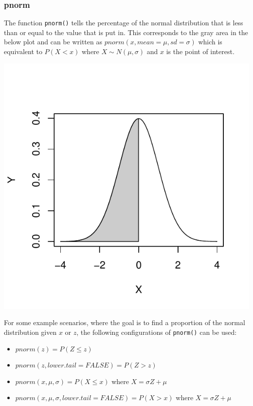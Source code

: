 \documentclass{report}\usepackage[]{graphicx}\usepackage[]{color}
\makeatletter
\def\maxwidth{ %
  \ifdim\Gin@nat@width>\linewidth
    \linewidth
  \else
    \Gin@nat@width
  \fi
}
\newenvironment{knitrout}{}{} %
\makeatother
\begin{document}
\subsubsection{pnorm} 
The function \texttt{pnorm()} tells the percentage of the normal distribution that is less than or equal to the value that is put in.  This corresponds to the gray area in the below plot and can be written as $pnorm(x, mean = \mu, sd = \sigma)$ which is equivalent to $P(X < x)$ where $X \sim N(\mu, \sigma)$ and $x$ is the point of interest.    
 
\begin{knitrout}
\color{fgcolor}

{\centering \includegraphics[width=\maxwidth]{figure/unnamed-chunk-85-1} 

}



\end{knitrout}

For some example scenarios, where the goal is to find a proportion of the normal distribution given $x$ or $z$, the following configurations of \texttt{pnorm()} can be used: 
\begin{itemize}
\item $pnorm(z) = P(Z \leq z)$ 
\item $pnorm(z, lower.tail = FALSE) = P(Z > z)$ 
\item $pnorm(x, \mu, \sigma) = P(X \leq x)$ where $X = \sigma Z + \mu$ 
\item $pnorm(x, \mu, \sigma, lower.tail = FALSE) = P(X > x)$ where $X = \sigma Z + \mu$ 
\end{itemize}
\end{document}
